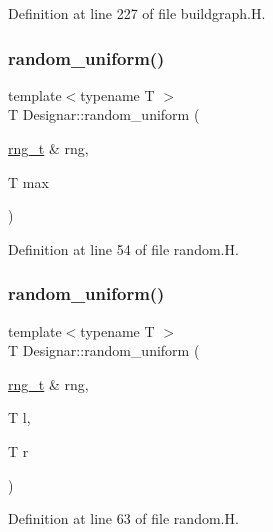 Definition at line 227 of file buildgraph.\+H.

\mbox{\label{namespace_designar_a1ac1e0ffd178b0439770840ea75144e0}} 
\subsubsection{\texorpdfstring{random\+\_\+uniform()}{random\_uniform()}\hspace{0.1cm}{\footnotesize\ttfamily [1/2]}}
{\footnotesize\ttfamily template$<$typename T $>$ \\
T Designar\+::random\+\_\+uniform (\begin{DoxyParamCaption}\item[{\hyperlink{namespace_designar_a9ca84e2ff5daa62ebc4dab52f3a6c855}{rng\+\_\+t} \&}]{rng,  }\item[{T}]{max }\end{DoxyParamCaption})}



Definition at line 54 of file random.\+H.

\mbox{\label{namespace_designar_a7b0ea319994973073cc92067730c1c1c}} 
\subsubsection{\texorpdfstring{random\+\_\+uniform()}{random\_uniform()}\hspace{0.1cm}{\footnotesize\ttfamily [2/2]}}
{\footnotesize\ttfamily template$<$typename T $>$ \\
T Designar\+::random\+\_\+uniform (\begin{DoxyParamCaption}\item[{\hyperlink{namespace_designar_a9ca84e2ff5daa62ebc4dab52f3a6c855}{rng\+\_\+t} \&}]{rng,  }\item[{T}]{l,  }\item[{T}]{r }\end{DoxyParamCaption})}



Definition at line 63 of file random.\+H.

\mbox{\label{namespace_designar_aae435a76c71e126af37716ef5549d79d}} 
